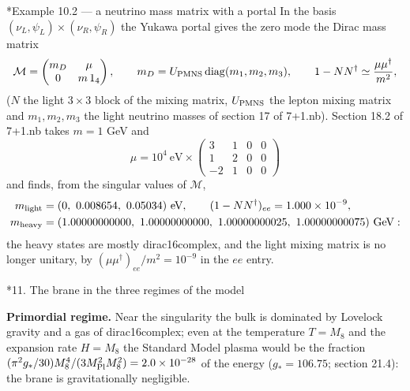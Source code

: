 \documentclass[10pt,a4paper]{article}
\makeatletter
\renewcommand\section{\@startsection{section}{1}{\z@}{-3.5ex \@plus -1ex \@minus -.2ex}{2.3ex \@plus.2ex}{\normalfont\Large\bfseries\raggedright}}
\renewcommand\subsubsection{\@startsection{subsubsection}{3}{\z@}{-3.25ex\@plus -1ex \@minus -.2ex}{1.5ex \@plus .2ex}{\normalfont\normalsize\bfseries\raggedright}}
\makeatother
\begin{document}
\subsubsection*{Example 10.2 — a neutrino mass matrix with a portal}
In the basis $(\nu_L,\psi_L)\times(\nu_R,\psi_R)$ the Yukawa portal gives the zero mode the Dirac mass matrix
\begin{equation*}
\mathcal M=\begin{pmatrix}m_D&\mu\\0&m\,1_4\end{pmatrix},\qquad m_D=U_{\rm PMNS}\,\mathrm{diag}(m_1,m_2,m_3),\qquad 1-NN^\dagger\simeq\frac{\mu\mu^\dagger}{m^2},
\end{equation*}
($N$ the light $3\times3$ block of the mixing matrix, $U_{\rm PMNS}$ the lepton mixing matrix and $m_1,m_2,m_3$ the light neutrino masses of section 17 of 7+1.nb). Section 18.2 of 7+1.nb takes $m=1$ GeV and
\begin{equation*}
\mu=10^4\ \text{eV}\times\begin{pmatrix}3&1&0&0\\1&2&0&0\\-2&1&0&0\end{pmatrix}
\end{equation*}
and finds, from the singular values of $\mathcal M$,
\begin{align*}
m_{\rm light}&=(0,\ 0.008654,\ 0.05034)\ \text{eV},\qquad (1-NN^\dagger)_{ee}=1.000\times10^{-9}, \\
m_{\rm heavy}&=(1.00000000000,\ 1.00000000000,\ 1.00000000025,\ 1.00000000075)\ \text{GeV}:
\end{align*}
the heavy states are mostly dirac16complex, and the light mixing matrix is no longer unitary, by $(\mu\mu^\dagger)_{ee}/m^2=10^{-9}$ in the $ee$ entry.

\section*{11. The brane in the three regimes of the model}
\textbf{Primordial regime.} Near the singularity the bulk is dominated by Lovelock gravity and a gas of dirac16complex; even at the temperature $T=M_8$ and the expansion rate $H=M_8$ the Standard Model plasma would be the fraction $(\pi^2g_*/30)M_8^4/(3M_{\rm Pl}^2M_8^2)=2.0\times10^{-28}$ of the energy ($g_*=106.75$; section 21.4): the brane is gravitationally negligible.
\end{document}
